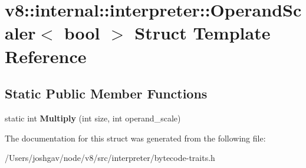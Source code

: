 \hypertarget{structv8_1_1internal_1_1interpreter_1_1_operand_scaler}{}\section{v8\+:\+:internal\+:\+:interpreter\+:\+:Operand\+Scaler$<$ bool $>$ Struct Template Reference}
\label{structv8_1_1internal_1_1interpreter_1_1_operand_scaler}
\subsection*{Static Public Member Functions}
\begin{DoxyCompactItemize}
\item 
static int {\bfseries Multiply} (int size, int operand\+\_\+scale)\hypertarget{structv8_1_1internal_1_1interpreter_1_1_operand_scaler_aef83c780bf9230364f15b9edd876eda2}{}\label{structv8_1_1internal_1_1interpreter_1_1_operand_scaler_aef83c780bf9230364f15b9edd876eda2}

\end{DoxyCompactItemize}


The documentation for this struct was generated from the following file\+:\begin{DoxyCompactItemize}
\item 
/\+Users/joshgav/node/v8/src/interpreter/bytecode-\/traits.\+h\end{DoxyCompactItemize}

